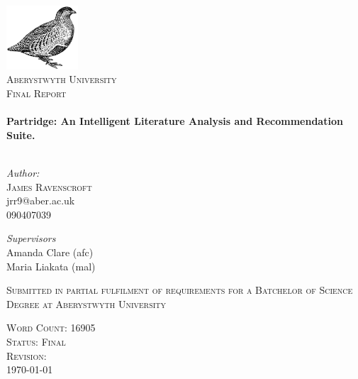 \begin{titlepage}
 
\begin{center}

\includegraphics[width=0.20\textwidth]{../cover_logo.png}\\[1cm]


\textsc{\LARGE Aberystwyth University}\\[0.5cm]
\textsc{\LARGE Final Report}\\[0.5cm]



 
\HRule \\[0.4cm]
{ \huge \bfseries Partridge: An Intelligent Literature Analysis and
Recommendation Suite.}\\[0.4cm]

\HRule \\[1.5cm]

\begin{minipage}{0.4\textwidth}
\begin{flushleft} \large
\emph{Author:}\\
\textsc{James Ravenscroft}\\
jrr9@aber.ac.uk\\
090407039\\
\end{flushleft}
\end{minipage}
\begin{minipage}{0.4\textwidth}
\begin{flushright} \large
\emph{Supervisors} \\
Amanda Clare (afc)\\
Maria Liakata (mal)

\end{flushright}
\end{minipage}


\vfill

\textsc{Submitted in partial fulfilment of requirements for a Batchelor of
Science Degree at Aberystwyth University}



\vfill
 
\textsc{\large Word Count: 16905}\\
\textsc{\large Status: Final}\\
\textsc{\large Revision: \Revision{} }\\
{\large \today}
 
\end{center}

\frontmatter
 
\end{titlepage}

